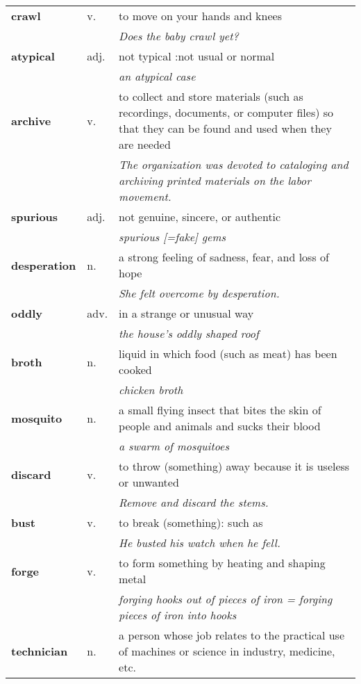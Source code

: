 \documentclass[a4paper]{article}
\begin{document}
\begin{longtable}{llp{11cm}}
\textbf{crawl} & v. &  to move on your hands and knees \\
 & & \textit{Does the baby crawl yet?}\\[0.08cm]
\textbf{atypical} & adj. &  not typical :not usual or normal \\
 & & \textit{an atypical case}\\[0.08cm]
\textbf{archive} & v. &  to collect and store materials (such as recordings, documents, or computer files) so that they can be found and used when they are needed \\
 & & \textit{The organization was devoted to cataloging and archiving printed materials on the labor movement.}\\[0.08cm]
\textbf{spurious} & adj. &  not genuine, sincere, or authentic \\
 & & \textit{spurious [=fake] gems}\\[0.08cm]
\textbf{desperation} & n. &  a strong feeling of sadness, fear, and loss of hope \\
 & & \textit{She felt overcome by desperation.}\\[0.08cm]
\textbf{oddly} & adv. &  in a strange or unusual way \\
 & & \textit{the house's oddly shaped roof}\\[0.08cm]
\textbf{broth} & n. &  liquid in which food (such as meat) has been cooked \\
 & & \textit{chicken broth}\\[0.08cm]
\textbf{mosquito} & n. &  a small flying insect that bites the skin of people and animals and sucks their blood \\
 & & \textit{a swarm of mosquitoes}\\[0.08cm]
\textbf{discard} & v. &  to throw (something) away because it is useless or unwanted \\
 & & \textit{Remove and discard the stems.}\\[0.08cm]
\textbf{bust} & v. &  to break (something): such as\\
 & & \textit{He busted his watch when he fell.}\\[0.08cm]
\textbf{forge} & v. &  to form something by heating and shaping metal \\
 & & \textit{forging hooks out of pieces of iron = forging pieces of iron into hooks}\\[0.08cm]
\textbf{technician} & n. &  a person whose job relates to the practical use of machines or science in industry, medicine, etc. \\

\end{longtable}
\end{document}
